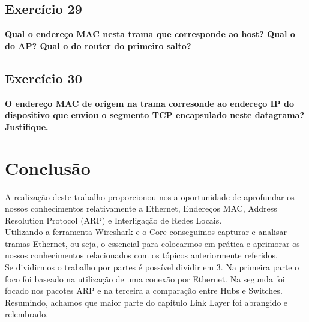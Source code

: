 \documentclass[a4paper]{report}
\begin{document}
\section{Exercício 29}
\textbf{Qual o endereço MAC nesta trama que corresponde ao host? Qual o do AP?
    Qual o do router do primeiro salto?}

\section{Exercício 30}
\textbf{O endereço MAC de origem na trama corresonde ao endereço IP do
    dispositivo que enviou o segmento TCP encapsulado neste datagrama?
    Justifique.}

\chapter{Conclusão}
A realização deste trabalho proporcionou nos a oportunidade de aprofundar os
nossos conhecimentos relativamente a Ethernet, Endereços MAC, Address Resolution
Protocol (ARP) e Interligação de Redes Locais.\\
Utilizando a ferramenta Wireshark e o Core conseguimos capturar e analisar
tramas Ethernet, ou seja, o essencial para colocarmos em prática e aprimorar os
nossos conhecimentos relacionados com os tópicos anteriormente referidos.\\
Se dividirmos o trabalho por partes é possível dividir em 3. Na primeira parte o
foco foi baseado na utilização de uma conexão por Ethernet. Na segunda foi
focado nos pacotes ARP e na terceira a comparação entre Hubs e Switches.
Resumindo, achamos que maior parte do capitulo Link Layer foi abrangido e
relembrado.
\end{document}
